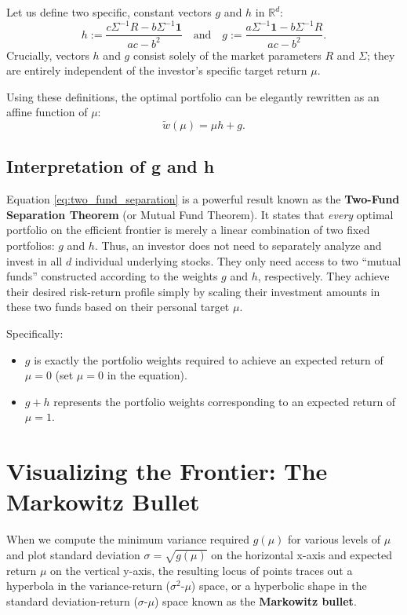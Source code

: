 Let us define two specific, constant vectors $g$ and $h$ in $\mathbb{R}^d$:
\begin{equation}
    h := \frac{c \Sigma^{-1} R - b \Sigma^{-1} \mathbf{1}}{ac - b^2} \quad \text{and} \quad g := \frac{a \Sigma^{-1} \mathbf{1} - b \Sigma^{-1} R}{ac - b^2}.
\end{equation}
Crucially, vectors $h$ and $g$ consist solely of the market parameters $R$ and $\Sigma$; they are entirely independent of the investor's specific target return $\mu$.

Using these definitions, the optimal portfolio can be elegantly rewritten as an affine function of $\mu$:
\begin{equation}
    \tilde{w}(\mu) = \mu h + g. \label{eq:two_fund_separation}
\end{equation}

\subsection{Interpretation of g and h}
Equation \eqref{eq:two_fund_separation} is a powerful result known as the \textbf{Two-Fund Separation Theorem} (or Mutual Fund Theorem).
It states that \textit{every} optimal portfolio on the efficient frontier is merely a linear combination of two fixed portfolios: $g$ and $h$. Thus, an investor does not need to separately analyze and invest in all $d$ individual underlying stocks. They only need access to two ``mutual funds'' constructed according to the weights $g$ and $h$, respectively. They achieve their desired risk-return profile simply by scaling their investment amounts in these two funds based on their personal target $\mu$.

Specifically:
\begin{itemize}
    \item $g$ is exactly the portfolio weights required to achieve an expected return of $\mu = 0$ (set $\mu=0$ in the equation).
    \item $g+h$ represents the portfolio weights corresponding to an expected return of $\mu = 1$.
\end{itemize}

\section{Visualizing the Frontier: The Markowitz Bullet}

When we compute the minimum variance required $g(\mu)$ for various levels of $\mu$ and plot standard deviation $\sigma = \sqrt{g(\mu)}$ on the horizontal x-axis and expected return $\mu$ on the vertical y-axis, the resulting locus of points traces out a hyperbola in the variance-return ($\sigma^2$-$\mu$) space, or a hyperbolic shape in the standard deviation-return ($\sigma$-$\mu$) space known as the \textbf{Markowitz bullet}.


